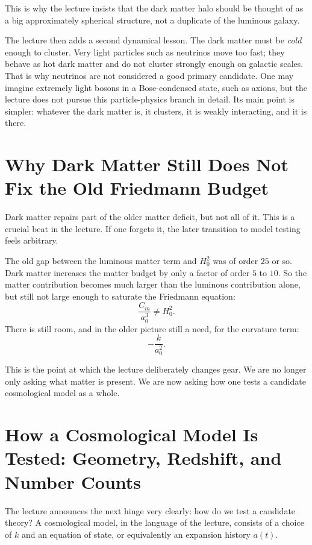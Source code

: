 This is why the lecture insists that the dark matter halo should be thought of as a big approximately spherical structure, not a duplicate of the luminous galaxy.

The lecture then adds a second dynamical lesson. The dark matter must be \emph{cold} enough to cluster. Very light particles such as neutrinos move too fast; they behave as hot dark matter and do not cluster strongly enough on galactic scales. That is why neutrinos are not considered a good primary candidate. One may imagine extremely light bosons in a Bose-condensed state, such as axions, but the lecture does not pursue this particle-physics branch in detail. Its main point is simpler: whatever the dark matter is, it clusters, it is weakly interacting, and it is there.

\section{Why Dark Matter Still Does Not Fix the Old Friedmann Budget}

Dark matter repairs part of the older matter deficit, but not all of it. This is a crucial beat in the lecture. If one forgets it, the later transition to model testing feels arbitrary.

The old gap between the luminous matter term and \(H_0^2\) was of order \(25\) or so. Dark matter increases the matter budget by only a factor of order \(5\) to \(10\). So the matter contribution becomes much larger than the luminous contribution alone, but still not large enough to saturate the Friedmann equation:
\begin{equation}
\frac{C_m}{a_0^3}\neq H_0^2.
\end{equation}
There is still room, and in the older picture still a need, for the curvature term:
\begin{equation}
-\frac{k}{a_0^2}.
\end{equation}

This is the point at which the lecture deliberately changes gear. We are no longer only asking what matter is present. We are now asking how one tests a candidate cosmological model as a whole.

\section{How a Cosmological Model Is Tested: Geometry, Redshift, and Number Counts}

The lecture announces the next hinge very clearly: how do we test a candidate theory? A cosmological model, in the language of the lecture, consists of a choice of \(k\) and an equation of state, or equivalently an expansion history \(a(t)\).

